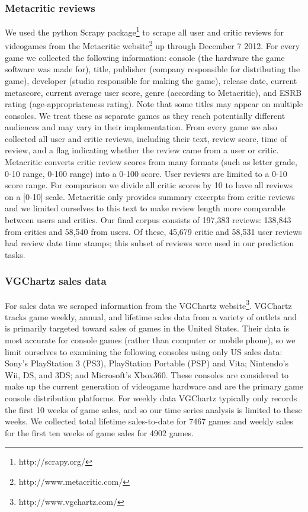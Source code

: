 \documentclass[letterpaper]{article}
\begin{document}
\subsubsection{Metacritic reviews}
We used the python Scrapy package\footnote{http://scrapy.org/} to scrape all user and critic reviews for videogames from the Metacritic website\footnote{http://www.metacritic.com/} up through December 7 2012. For every game we collected the following information: console (the hardware the game software was made for), title, publisher (company responsible for distributing the game), developer (studio responsible for making the game), release date, current metascore, current average user score, genre (according to Metacritic), and ESRB rating (age-appropriateness rating). Note that some titles may appear on multiple consoles. We treat these as separate games as they reach potentially different audiences and may vary in their implementation. From every game we also collected all user and critic reviews, including their text, review score, time of review, and a flag indicating whether the review came from a user or critic. Metacritic converts critic review scores from many formats (such as letter grade, 0-10 range, 0-100 range) into a 0-100 score. User reviews are limited to a 0-10 score range. For comparison we divide all critic scores by 10 to have all reviews on a [0-10] scale. Metacritic only provides summary excerpts from critic reviews and we limited ourselves to this text to make review length more comparable between users and critics. Our final corpus consists of 197,383 reviews: 138,843 from critics and 58,540 from users. Of these, 45,679 critic and 58,531 user reviews had review date time stamps; this subset of reviews were used in our prediction tasks.

\subsubsection{VGChartz sales data}
For sales data we scraped information from the VGChartz website\footnote{http://www.vgchartz.com/}. VGChartz tracks game weekly, annual, and lifetime sales data from a variety of outlets and is primarily targeted toward sales of games in the United States. Their data is most accurate for console games (rather than computer or mobile phone), so we limit ourselves to examining the following consoles using only US sales data: Sony's PlayStation 3 (PS3), PlayStation Portable (PSP) and Vita; Nintendo's Wii, DS, and 3DS; and Microsoft's Xbox360. These consoles are considered to make up the current generation of videogame hardware and are the primary game console distribution platforms. For weekly data VGChartz typically only records the first 10 weeks of game sales, and so our time series analysis is limited to these weeks. We collected total lifetime sales-to-date for 7467 games and weekly sales for the first ten weeks of game sales for 4902 games.
\end{document}
